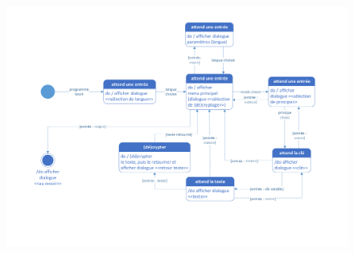 \documentclass[a4paper,12pt,abstracton,titlepage]{scrartcl}
\begin{document}
\begin{figure}[tpbh]
	\centering
  \includegraphics[width=\textwidth, trim=20mm 38mm 25mm 13mm, clip]{./Diagrammes/diagrammeDesEtats.pdf}
	\label{img:etats}
\end{figure}


\newpage
\end{document}
